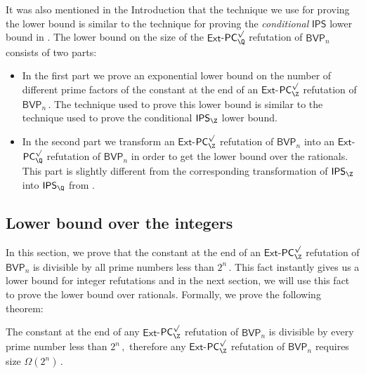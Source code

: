 \documentclass{toc}
\begin{document}
It was also mentioned in the %
Introduction  %
 that the technique we use for proving the lower bound is similar to the technique for proving the \textit{conditional} $\mathsf{IPS}$ lower bound in \cite{AGHT19_new}. The lower bound on the size of the $\mathsf{Ext}$-$\mathsf{PC}^{\surd}_{\Q}$ refutation of $\mathsf{BVP}_n$ consists of two parts:
\begin{itemize}
\item In the first part we prove an exponential lower bound on the number of different prime factors of the constant at the end of an $\mathsf{Ext}$-$\mathsf{PC}^{\surd}_{\Z}$ refutation of %
$\mathsf{BVP}_n\,.$ %
 The technique used to prove this lower bound is similar to the technique used to prove the conditional $\mathsf{IPS}_\Z$ lower bound.
\item In the second part we transform an $\mathsf{Ext}$-$\mathsf{PC}^{\surd}_{\Z}$ refutation of $\mathsf{BVP}_n$ into  an $\mathsf{Ext}$-$\mathsf{PC}^{\surd}_{\Q}$ refutation of $\mathsf{BVP}_n$ in order to get the lower bound over the rationals. This part is slightly different from the corresponding transformation of $\mathsf{IPS}_\Z$ into $\mathsf{IPS}_\Q$ from  \cite{AGHT19_new}.
\end{itemize}




%
\subsection{Lower bound over the integers}  %
In this section, we prove that the constant at %
the end of an $\mathsf{Ext}$-$\mathsf{PC}^{\surd}_{\Z}$ refutation of $\mathsf{BVP}_n$ is divisible by all prime numbers less than %
$2^n\,.$ %
 This fact instantly gives us a lower bound for integer refutations and in the next section, we will use this fact to prove the lower bound over rationals. Formally, we prove the following theorem:
\begin{theorem}
\label{lower bound for integers depth-inf}
The constant at %
the end of any $\mathsf{Ext}$-$\mathsf{PC}^{\surd}_{\Z}$ refutation of $\mathsf{BVP}_n$ is divisible by every prime number less than %
$2^n\,,$ %
 therefore any $\mathsf{Ext}$-$\mathsf{PC}^{\surd}_{\Z}$ refutation of $\mathsf{BVP}_n$  requires size %
$\Omega(2^n)\,.$ %
\end{theorem}
\end{document}
